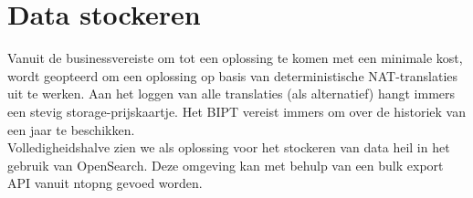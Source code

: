 \section{Data stockeren}
Vanuit de businessvereiste om tot een oplossing te komen met een minimale kost, wordt geopteerd om een oplossing op basis van deterministische NAT-translaties uit te werken. Aan het loggen van alle translaties (als alternatief) hangt immers een stevig storage-prijskaartje. Het BIPT vereist immers om over de historiek van een jaar te beschikken.\\ Volledigheidshalve zien we als oplossing voor het stockeren van data heil in het gebruik van OpenSearch. Deze omgeving kan met behulp van een bulk export API vanuit ntopng gevoed worden.
